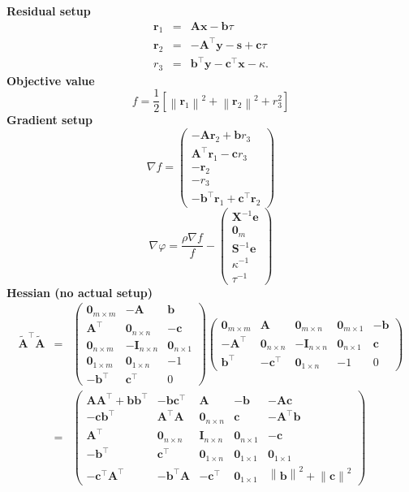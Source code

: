 \documentclass{article}
\newcommand{\tmstrong}[1]{\textbf{#1}}
\newcommand{\x}{\mathbf{x}}
\newcommand{\A}{\mathbf{A}}
\newcommand{\0}{\textbf{0}}
\newcommand{\e}{\mathbf{e}}
\newcommand{\n}{\nabla}
\newcommand{\X}{\mathbf{X}}
\newcommand{\I}{\mathbf{I}}
\newcommand{\tmb}{\mathbf{b}}
\newcommand{\tmc}{\mathbf{c}}
\newcommand{\y}{\mathbf{y}}
\newcommand{\s}{\mathbf{s}}
\newcommand{\bs}{\mathbf{S}}
\newcommand{\tmr}{\mathbf{r}}
\begin{document}
{\tmstrong{Residual setup}}
\begin{eqnarray*}
  \tmr_1 & = & \A \x - \tmb \tau\\
  \tmr_2 & = & - \A^{\top} \y - \s + \tmc \tau\\
  r_3 & = & \tmb^{\top} \y - \tmc^{\top} \x - \kappa .
\end{eqnarray*}
{\tmstrong{Objective value}}
\[ f = \frac{1}{2} \left[ \left\| \tmr_1 \right\|^2 + \left\| \tmr_2
   \right\|^2 + r_3^2 \right] \]
{\tmstrong{Gradient setup}}
\[ \nabla f = \left(\begin{array}{c}
     - \A \tmr_2 + \tmb r_3\\
     \A^{\top} \tmr_1 - \tmc r_3\\
     - \tmr_2\\
     - r_3\\
     - \tmb^{\top} \tmr_1 + \tmc^{\top} \tmr_2
   \end{array}\right) \]
\[ \nabla \varphi = \frac{\rho \n f}{f} - \left(\begin{array}{c}
     \X^{- 1} \e\\
     \0_m\\
     \bs^{- 1} \e\\
     \kappa^{- 1}\\
     \tau^{- 1}
   \end{array}\right) \]
{\tmstrong{Hessian (no actual setup)}}
\begin{eqnarray*}
  \widetilde{\A}^{\top} \widetilde{\A} & = & \left(\begin{array}{ccc}
    \0_{m \times m} & - \A & \tmb\\
    \A^{\top} & \0_{n \times n} & - \tmc\\
    \0_{n \times m} & - \I_{n \times n} & \0_{n \times 1}\\
    \0_{1 \times m} & \0_{1 \times n} & - 1\\
    - \tmb^{\top} & \tmc^{\top} & 0
  \end{array}\right) \left(\begin{array}{ccccc}
    \0_{m \times m} & \A & \0_{m \times n} & \0_{m \times 1} & - \tmb\\
    - \A^{\top} & \0_{n \times n} & - \I_{n \times n} & \0_{n \times 1} &
    \tmc\\
    \tmb^{\top} & - \tmc^{\top} & \0_{1 \times n} & - 1 & 0
  \end{array}\right)\\
  & = & \left(\begin{array}{ccccc}
    \A \A^{\top} + \tmb \tmb^{\top} & - \tmb \tmc^{\top} & \A & - \tmb & - \A
    \tmc\\
    - \tmc \tmb^{\top} & \A^{\top} \A & \0_{n \times n} & \tmc & - \A^{\top}
    \tmb\\
    \A^{\top} & \0_{n \times n} & \I_{n \times n} & \0_{n \times 1} & - \tmc\\
    - \tmb^{\top} & \tmc^{\top} & \0_{1 \times n} & \0_{1 \times 1} & \0_{1
    \times 1}\\
    - \tmc^{\top} \A^{\top} & - \tmb^{\top} \A & - \tmc^{\top} & \0_{1 \times
    1} & \left\| \tmb \right\|^2 + \left\| \tmc \right\|^2
  \end{array}\right)
\end{eqnarray*}
\end{document}

